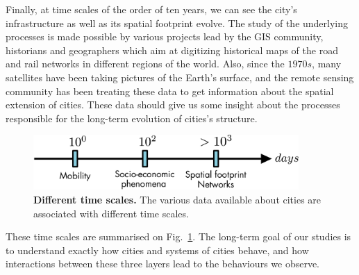 Finally, at time scales of the order of ten years, we can see the city's
infrastructure as well as its spatial footprint evolve. The study of the
underlying processes is made possible by various projects lead by the GIS
community, historians and geographers which aim at digitizing historical maps of
the road and rail networks in different regions of the world. Also, since the
$1970s$, many satellites have been taking pictures of the Earth's surface, and
the remote sensing community has been treating these data to get information
about the spatial extension of cities. These data should give us some insight
about the processes responsible for the long-term evolution of cities's
structure.\\

\begin{figure}[!h]
    \centering
    \includegraphics[width=0.9\textwidth]{./gfx/chapter-intro/time_scales.pdf}
    \caption{{\bf Different time scales.} The various data available about
    cities are associated with different time scales.\label{fig:timescale}}
\end{figure}

These time scales are summarised on Fig.~\ref{fig:timescale}. The long-term goal
of our studies is to understand exactly how cities and systems of cities behave,
and how interactions between these three layers lead to the behaviours we
observe. 
